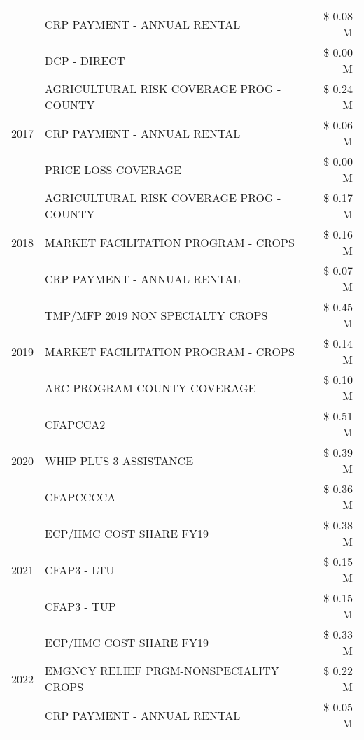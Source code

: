\begin{tabular}{llr}
 & CRP PAYMENT - ANNUAL RENTAL & \$ 0.08 M \\
 & DCP - DIRECT & \$ 0.00 M \\
\cline{1-3}
\multirow[t]{3}{*}{2017} & AGRICULTURAL RISK COVERAGE PROG - COUNTY & \$ 0.24 M \\
 & CRP PAYMENT - ANNUAL RENTAL & \$ 0.06 M \\
 & PRICE LOSS COVERAGE & \$ 0.00 M \\
\cline{1-3}
\multirow[t]{3}{*}{2018} & AGRICULTURAL RISK COVERAGE PROG - COUNTY & \$ 0.17 M \\
 & MARKET FACILITATION PROGRAM - CROPS & \$ 0.16 M \\
 & CRP PAYMENT - ANNUAL RENTAL & \$ 0.07 M \\
\cline{1-3}
\multirow[t]{3}{*}{2019} & TMP/MFP 2019 NON SPECIALTY CROPS & \$ 0.45 M \\
 & MARKET FACILITATION PROGRAM - CROPS & \$ 0.14 M \\
 & ARC PROGRAM-COUNTY COVERAGE & \$ 0.10 M \\
\cline{1-3}
\multirow[t]{3}{*}{2020} & CFAPCCA2 & \$ 0.51 M \\
 & WHIP PLUS 3 ASSISTANCE & \$ 0.39 M \\
 & CFAPCCCCA & \$ 0.36 M \\
\cline{1-3}
\multirow[t]{3}{*}{2021} & ECP/HMC COST SHARE FY19 & \$ 0.38 M \\
 & CFAP3 - LTU & \$ 0.15 M \\
 & CFAP3 - TUP & \$ 0.15 M \\
\cline{1-3}
\multirow[t]{3}{*}{2022} & ECP/HMC COST SHARE FY19 & \$ 0.33 M \\
 & EMGNCY RELIEF PRGM-NONSPECIALITY CROPS & \$ 0.22 M \\
 & CRP PAYMENT - ANNUAL RENTAL & \$ 0.05 M \\
\cline{1-3}
\bottomrule
\end{tabular}
